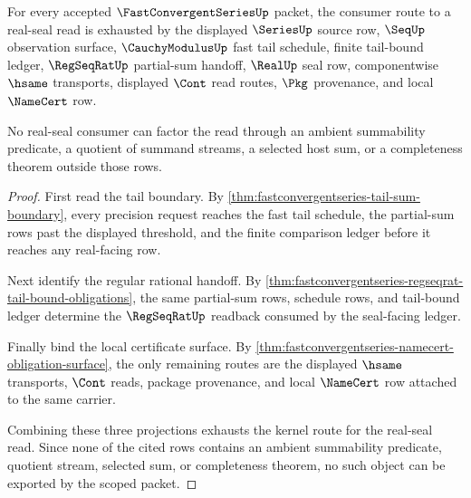 \begin{theorem}
\label{thm:fastconvergentseries-scoped-kernel-factorization}
For every accepted $\FastConvergentSeriesUp$ packet, the consumer route to a real-seal read is exhausted by the displayed $\SeriesUp$ source row, $\SeqUp$ observation surface, $\CauchyModulusUp$ fast tail schedule, finite tail-bound ledger, $\RegSeqRatUp$ partial-sum handoff, $\RealUp$ seal row, componentwise $\hsame$ transports, displayed $\Cont$ read routes, $\Pkg$ provenance, and local $\NameCert$ row.

No real-seal consumer can factor the read through an ambient summability predicate, a quotient of summand streams, a selected host sum, or a completeness theorem outside those rows.
\end{theorem}
\begin{proof}
First read the tail boundary. By \autoref{thm:fastconvergentseries-tail-sum-boundary}, every precision request reaches the fast tail schedule, the partial-sum rows past the displayed threshold, and the finite comparison ledger before it reaches any real-facing row.

Next identify the regular rational handoff. By \autoref{thm:fastconvergentseries-regseqrat-tail-bound-obligations}, the same partial-sum rows, schedule rows, and tail-bound ledger determine the $\RegSeqRatUp$ readback consumed by the seal-facing ledger.

Finally bind the local certificate surface. By \autoref{thm:fastconvergentseries-namecert-obligation-surface}, the only remaining routes are the displayed $\hsame$ transports, $\Cont$ reads, package provenance, and local $\NameCert$ row attached to the same carrier.

Combining these three projections exhausts the kernel route for the real-seal read. Since none of the cited rows contains an ambient summability predicate, quotient stream, selected sum, or completeness theorem, no such object can be exported by the scoped packet.
\end{proof}

